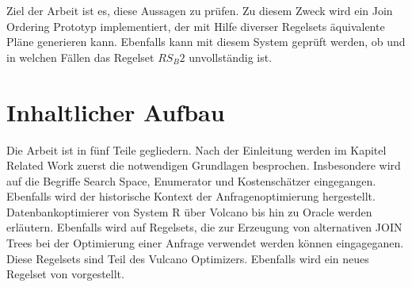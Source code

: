 Ziel der Arbeit ist es, diese Aussagen zu prüfen. Zu diesem Zweck wird ein Join Ordering Prototyp implementiert, der mit Hilfe diverser Regelsets äquivalente Pläne generieren kann. Ebenfalls kann mit diesem System geprüft werden, ob und in welchen Fällen das Regelset $RS_B2$ unvollständig ist.







\section{Inhaltlicher Aufbau}
Die Arbeit ist in fünf Teile gegliedern. Nach der Einleitung werden im Kapitel Related Work zuerst die notwendigen Grundlagen besprochen. Insbesondere wird auf die Begriffe Search Space, Enumerator und Kostenschätzer eingegangen. Ebenfalls wird der historische Kontext der Anfragenoptimierung hergestellt. Datenbankoptimierer von System R über Volcano bis hin zu Oracle werden erläutern. Ebenfalls wird auf Regelsets, die zur Erzeugung von alternativen JOIN Trees bei der Optimierung einer Anfrage verwendet werden können eingageganen. Diese Regelsets sind Teil des Vulcano Optimizers. Ebenfalls wird ein neues Regelset von \cite{shanbhag2014optimizing} vorgestellt.

